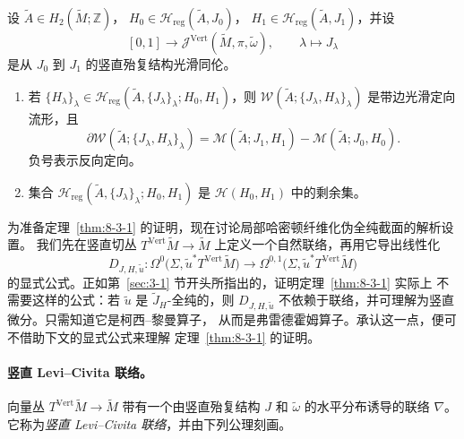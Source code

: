 \begin{theorem}\label{thm:8-3-3}
设 $\widetilde A\in H_2(\widetilde M;\mathbb Z)$，
$H_0\in\mathcal H_{\mathrm{reg}}(\widetilde A,J_0)$，
$H_1\in\mathcal H_{\mathrm{reg}}(\widetilde A,J_1)$，并设
\[
  [0,1]\longrightarrow
  \mathcal J^{\mathrm{Vert}}(\widetilde M,\pi,\widetilde\omega),
  \qquad \lambda\longmapsto J_\lambda
\]
是从 $J_0$ 到 $J_1$ 的竖直殆复结构光滑同伦。
\begin{enumerate}[label=\textup{(\roman*)},leftmargin=3em]
\item 若
$\{H_\lambda\}_\lambda\in
\mathcal H_{\mathrm{reg}}(\widetilde A,\{J_\lambda\}_\lambda;H_0,H_1)$，则
$\mathcal W(\widetilde A;\{J_\lambda,H_\lambda\}_\lambda)$ 是带边光滑定向流形，且
\[
  \partial\mathcal W(\widetilde A;\{J_\lambda,H_\lambda\}_\lambda)
  =\mathcal M(\widetilde A;J_1,H_1)
   -\mathcal M(\widetilde A;J_0,H_0).
\]
负号表示反向定向。
\item 集合
$\mathcal H_{\mathrm{reg}}(\widetilde A,\{J_\lambda\}_\lambda;H_0,H_1)$ 是
$\mathcal H(H_0,H_1)$ 中的剩余集。
\end{enumerate}
\end{theorem}

为准备定理~\ref{thm:8-3-1} 的证明，现在讨论局部哈密顿纤维化伪全纯截面的解析设置。
我们先在竖直切丛
$T^{\mathrm{Vert}}\widetilde M\to\widetilde M$ 上定义一个自然联络，再用它导出线性化
\[
  D_{J,H,\widetilde u}:
  \Omega^0\bigl(\Sigma,\widetilde u^*T^{\mathrm{Vert}}\widetilde M\bigr)
  \longrightarrow
  \Omega^{0,1}\bigl(\Sigma,\widetilde u^*T^{\mathrm{Vert}}\widetilde M\bigr)
\]
的显式公式。正如第~\ref{sec:3-1} 节开头所指出的，证明定理~\ref{thm:8-3-1} 实际上
不需要这样的公式：若 $\widetilde u$ 是 $\widetilde J_H$-全纯的，则
$D_{J,H,\widetilde u}$ 不依赖于联络，并可理解为竖直微分。只需知道它是柯西--黎曼算子，
从而是弗雷德霍姆算子。承认这一点，便可不借助下文的显式公式来理解
定理~\ref{thm:8-3-1} 的证明。

\paragraph{竖直 Levi--Civita 联络。}
向量丛 $T^{\mathrm{Vert}}\widetilde M\to\widetilde M$ 带有一个由竖直殆复结构 $J$ 和
$\widetilde\omega$ 的水平分布诱导的联络 $\nabla$。它称为\emph{竖直 Levi--Civita
联络}，并由下列公理刻画。

